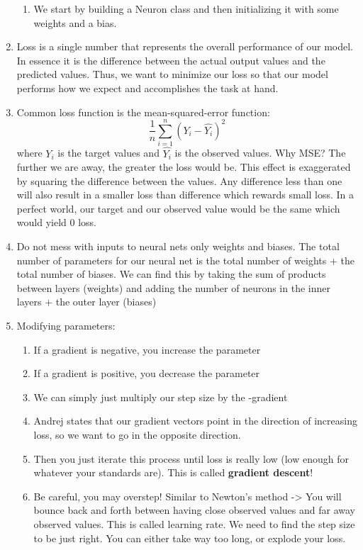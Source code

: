 \documentclass[a4paper, 11pt, oneside]{researchjournal} %
\begin{document}
\begin{enumerate}
\begin{enumerate}
        \item We start by building a Neuron class and then initializing it with some weights and a bias. 
    \end{enumerate}
    \item Loss is a single number that represents the overall performance of our model. In essence it is the difference between the actual output values and the predicted values. Thus, we want to minimize our loss so that our model performs how we expect and accomplishes the task at hand. 
    \item Common loss function is the mean-squared-error function: $$\frac{1}{n}\sum_{i=1}^{n}\left( Y_{i} - \hat{Y_{i}}\right)^2$$ where $Y_i$ is the target values and $\hat{Y_i}$ is the observed values. Why MSE? The further we are away, the greater the loss would be. This effect is exaggerated by squaring the difference between the values. Any difference less than one will also result in a smaller loss than difference which rewards small loss. In a perfect world, our target and our observed value would be the same which would yield 0 loss. 
    \item Do not mess with inputs to neural nets only weights and biases. The total number of parameters for our neural net is the total number of weights + the total number of biases. We can find this by taking the sum of products between layers (weights) and adding the number of neurons in the inner layers + the outer layer (biases)
    \item Modifying parameters: 
    \begin{enumerate}
        \item If a gradient is negative, you increase the parameter 
        \item If a gradient is positive, you decrease the parameter
        \item We can simply just multiply our step size by the -gradient
        \item Andrej states that our gradient vectors point in the direction of increasing loss, so we want to go in the opposite direction. 
        \item Then you just iterate this process until loss is really low (low enough for whatever your standards are). This is called \textbf{gradient descent}!
        \item Be careful, you may overstep! Similar to Newton's method -> You will bounce back and forth between having close observed values and far away observed values. This is called learning rate. We need to find the step size to be just right. You can either take way too long, or explode your loss. 

\end{enumerate}
\end{enumerate}
\end{document}
